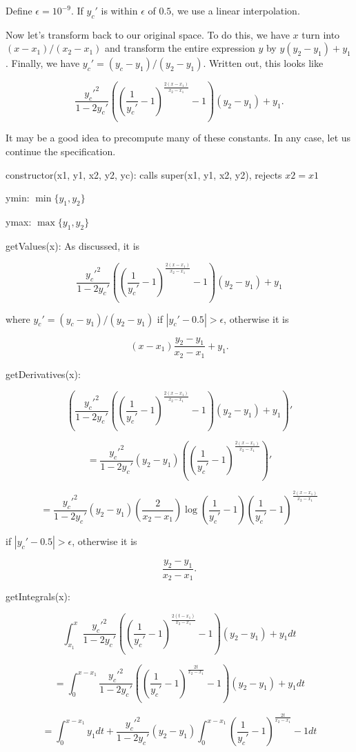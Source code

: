 \documentclass{article}
\begin{document}
Define $\epsilon=10^{-9}$. If $y_c'$ is within $\epsilon$ of $0.5$, we use a linear interpolation.

Now let's transform back to our original space. To do this, we have $x$ turn into $(x-x_1)/(x_2-x_1)$ and transform the entire expression $y$ by $y(y_2-y_1)+y_1$. Finally, we have $y_c'=(y_c-y_1)/(y_2-y_1)$. Written out, this looks like

$$\frac{y_c'^2}{1-2y_c'}\left(\left(\frac{1}{y_c'}-1\right)^{\frac{2(x-x_1)}{x_2-x_1}}-1\right)(y_2-y_1)+y_1.$$

It may be a good idea to precompute many of these constants. In any case, let us continue the specification.

constructor(x1, y1, x2, y2, yc): calls super(x1, y1, x2, y2), rejects $x2 = x1$

ymin: $\min\{y_1,y_2\}$

ymax: $\max\{y_1,y_2\}$

getValues(x): As discussed, it is

$$\frac{y_c'^2}{1-2y_c'}\left(\left(\frac{1}{y_c'}-1\right)^{\frac{2(x-x_1)}{x_2-x_1}}-1\right)(y_2-y_1)+y_1$$

where $y_c'=(y_c-y_1)/(y_2-y_1)$ if $|y_c'-0.5| > \epsilon$, otherwise it is

$$(x-x_1)\frac{y_2-y_1}{x_2-x_1} + y_1.$$

getDerivatives(x): 

$$\left(\frac{y_c'^2}{1-2y_c'}\left(\left(\frac{1}{y_c'}-1\right)^{\frac{2(x-x_1)}{x_2-x_1}}-1\right)(y_2-y_1)+y_1\right)'$$

$$=\frac{y_c'^2}{1-2y_c'}\left(y_2-y_1\right)\left(\left(\frac{1}{y_c'}-1\right)^{\frac{2\left(x-x_1\right)}{x_2-x_1}}\right)'$$

$$=\boxed{\frac{y_c'^2}{1-2y_c'}\left(y_2-y_1\right)\left(\frac{2}{x_2-x_1}\right)\log\left(\frac{1}{y_c'}-1\right)\left(\frac{1}{y_c'}-1\right)^{\frac{2(x-x_1)}{x_2-x_1}}}$$

if $|y_c'-0.5| > \epsilon$, otherwise it is

$$\frac{y_2-y_1}{x_2-x_1}.$$

getIntegrals(x):

$$\int_{x_1}^{x}\frac{y_c'^2}{1-2y_c'}\left(\left(\frac{1}{y_c'}-1\right)^{\frac{2(t-x_1)}{x_2-x_1}}-1\right)(y_2-y_1)+y_1 dt$$

$$=\int_{0}^{x-x_1}\frac{y_c'^2}{1-2y_c'}\left(\left(\frac{1}{y_c'}-1\right)^{\frac{2t}{x_2-x_1}}-1\right)(y_2-y_1)+y_1 dt$$

$$=\int_{0}^{x-x_1}y_1 dt + \frac{y_c'^2}{1-2y_c'} (y_2-y_1) \int_{0}^{x-x_1} \left(\frac{1}{y_c'}-1\right)^{\frac{2t}{x_2-x_1}}-1 dt$$
\end{document}
